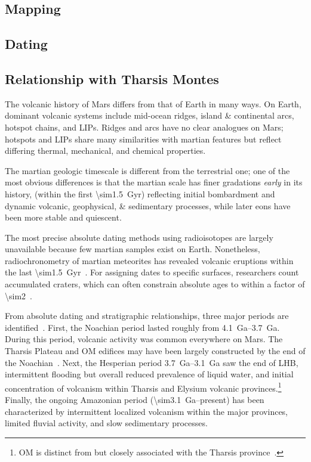 \subsection{Mapping}
\subsection{Dating}
\subsection{Relationship with Tharsis Montes}

The volcanic history of Mars differs from that of Earth in many ways. On Earth, dominant volcanic systems include mid-ocean ridges, island \& continental arcs, hotspot chains, and \acp{LIP}. Ridges and arcs have no clear analogues on Mars; hotspots and \acp{LIP} share many similarities with martian features but reflect differing thermal, mechanical, and chemical properties.

The martian geologic timescale is different from the terrestrial one; one of the most obvious differences is that the martian scale has finer gradations \textit{early} in its history, (within the first \qty{\sim1.5}{Gyr}) reflecting initial bombardment and dynamic volcanic, geophysical, \& sedimentary processes, while later eons have been more stable and quiescent.

The most precise absolute dating methods using radioisotopes are largely unavailable because few martian samples exist on Earth. Nonetheless, radiochronometry of martian meteorites has revealed volcanic eruptions within the last \qty{\sim1.5}{Gyr}~\parencite[e.g.,][]{cohen_taking_2017}. For assigning dates to specific surfaces, researchers count accumulated craters, which can often constrain absolute ages to within a factor of \num{\sim2}~\parencite{kneissl_map-projection-independent_2011}.

From absolute dating and stratigraphic relationships, three major periods are identified~\parencite{carr_geologic_2010}. First, the Noachian period lasted roughly from \qtyrange{4.1}{3.7}{Ga}. During this period, volcanic activity was common everywhere on Mars. The Tharsis Plateau and \ac{OM} edifices may have been largely constructed by the end of the Noachian~\parencite{isherwood_volcanic_2013}. Next, the Hesperian period \qtyrange{3.7}{3.1}{Ga} saw the end of \ac{LHB}, intermittent flooding but overall reduced prevalence of liquid water, and initial concentration of volcanism within Tharsis and Elysium volcanic provinces.\footnote{\ac{OM} is distinct from but closely associated with the Tharsis province~\parencite{bleacher_trends_2007}.} Finally, the ongoing Amazonian period (\qty{\sim3.1}{Ga}--present) has been characterized by intermittent localized volcanism within the major provinces, limited fluvial activity, and slow sedimentary processes.

